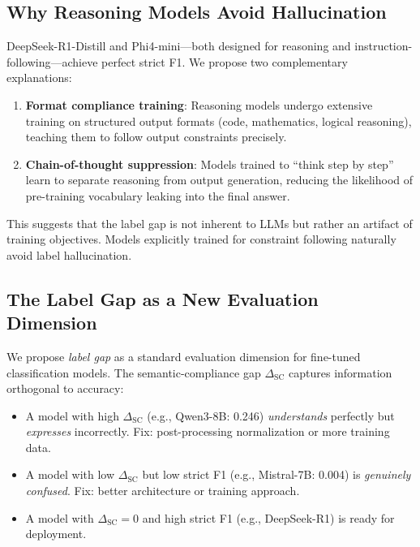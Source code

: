 \documentclass[journal]{IEEEtran}
\begin{document}
\subsection{Why Reasoning Models Avoid Hallucination}
DeepSeek-R1-Distill and Phi4-mini---both designed for reasoning and instruction-following---achieve perfect strict F1. We propose two complementary explanations:
\begin{enumerate}
\item \textbf{Format compliance training}: Reasoning models undergo extensive training on structured output formats (code, mathematics, logical reasoning), teaching them to follow output constraints precisely.
\item \textbf{Chain-of-thought suppression}: Models trained to ``think step by step'' learn to separate reasoning from output generation, reducing the likelihood of pre-training vocabulary leaking into the final answer.
\end{enumerate}

This suggests that the label gap is not inherent to LLMs but rather an artifact of training objectives. Models explicitly trained for constraint following naturally avoid label hallucination.

\subsection{The Label Gap as a New Evaluation Dimension}
We propose \emph{label gap} as a standard evaluation dimension for fine-tuned classification models. The semantic-compliance gap $\Delta_\text{SC}$ captures information orthogonal to accuracy:
\begin{itemize}
\item A model with high $\Delta_\text{SC}$ (e.g., Qwen3-8B: 0.246) \emph{understands} perfectly but \emph{expresses} incorrectly. Fix: post-processing normalization or more training data.
\item A model with low $\Delta_\text{SC}$ but low strict F1 (e.g., Mistral-7B: 0.004) is \emph{genuinely confused}. Fix: better architecture or training approach.
\item A model with $\Delta_\text{SC} = 0$ and high strict F1 (e.g., DeepSeek-R1) is ready for deployment.
\end{itemize}
\end{document}
